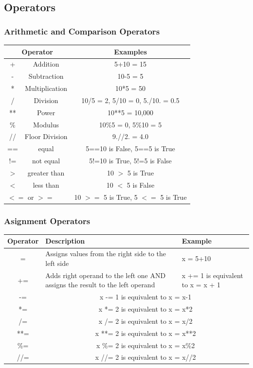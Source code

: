 \documentclass{beamer}
\begin{document}
\subsection{Operators}

\begin{frame}
\frametitle{Arithmetic and Comparison Operators}
	\begin{tabular}{cc|c}
		\multicolumn{2}{c|}{Operator} & Examples  \\ \hline
		+ & Addition & 5+10 = 15  \\
		- & Subtraction & 10-5 = 5  \\
		* & Multiplication & 10*5 = 50   \\
		/ & Division & 10/5 = 2, 5/10 = 0, 5./10. = 0.5 \\
		** & Power & 10**5 = 10,000 \\
		\% & Modulus & 10\%5 = 0, 5\%10 = 5 \\
		// & Floor Division & 9.//2. = 4.0 \\ \hline
		== & equal & 5==10 is False, 5==5 is True  \\
		!= & not equal & 5!=10 is True, 5!=5 is False  \\
		$>$ & greater than & 10 $>$ 5 is True  \\
		$<$ & less than & 10 $<$ 5 is False \\
		\multicolumn{2}{l|}{$<=$ or $>=$} & 10 $>=$ 5 is True, 5 $<=$ 5 is True \\
 	\end{tabular}	
\end{frame}

\begin{frame}
\frametitle{Asignment Operators}
	\begin{tabular}{c|p{5cm}|p{3cm}}
		Operator & Description & Example  \\ \hline
		= & Assigns values from the right side to the left side & x = 5+10 \\
		+= & Adds right operand to the left one AND assigns the result to the left operand & x += 1 is equivalent to x = x + 1 \\ \hline	
		-= &  \multicolumn{2}{c}{x -= 1  is equivalent to x = x-1} \\
		*= &  \multicolumn{2}{c}{x *= 2 is equivalent to x = x*2} \\
		/= &  \multicolumn{2}{c}{x /= 2 is equivalent to x = x/2 }\\
		**= & \multicolumn{2}{c}{x **= 2 is equivalent to x = x**2} \\
		\%= &  \multicolumn{2}{c}{x \%= 2 is equivalent to x = x\%2 }\\
		//= &  \multicolumn{2}{c}{x //= 2 is equivalent to x = x//2 }\\ 	
 	\end{tabular}	
\end{frame}
\end{document}
